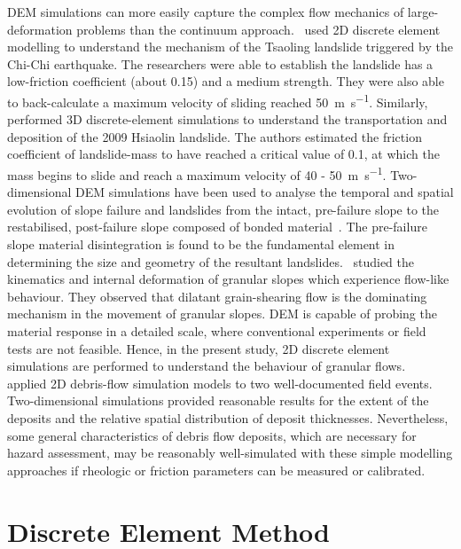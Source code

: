 DEM simulations can more easily capture the complex flow mechanics of 
large-deformation problems than the continuum approach.~\cite{Tang2009} used 2D 
discrete element modelling to understand the mechanism of the Tsaoling 
landslide triggered by the Chi-Chi earthquake. The researchers were able to 
establish the landslide has a low-friction coefficient 
(about 0.15) and a medium strength. They were also able to back-calculate a 
maximum velocity of sliding reached 50~\si{\m\per\s}. 
Similarly,~\cite{Tang2013} performed 3D discrete-element simulations to 
understand the 
transportation and deposition of the 2009 Hsiaolin landslide. The authors 
estimated the friction coefficient of landslide-mass to have reached a critical 
value of 0.1, at which the mass begins to slide and reach a maximum velocity of 
40 - 50~\si{\m\per\s}. Two-dimensional DEM simulations have been used to 
analyse the temporal and spatial evolution of slope failure and landslides from 
the intact, pre-failure slope to the restabilised, post-failure slope composed 
of bonded material~\citep{Katz2014}. The pre-failure slope material 
disintegration is found to be the fundamental element in determining the size 
and geometry of the resultant landslides.~\citet{Liu2013} studied the 
kinematics and internal deformation of granular slopes which experience 
flow-like behaviour. They observed that dilatant grain-shearing flow is 
the dominating mechanism in the movement of granular slopes. DEM is capable of 
probing the material response in a detailed scale, where conventional 
experiments or field tests are not feasible. Hence, in the present study, 2D 
discrete element simulations are performed to understand the behaviour of 
granular flows.~\citet{Rickenmann2006} applied 2D debris-flow simulation models 
to two well-documented field events. Two-dimensional simulations provided 
reasonable results for the extent of the deposits and the relative 
spatial distribution of deposit thicknesses. Nevertheless, some general 
characteristics of debris flow deposits, which are necessary for hazard 
assessment, may be reasonably well-simulated with these simple modelling 
approaches if rheologic or friction parameters can be measured or calibrated.
 

\section{Discrete Element Method}

